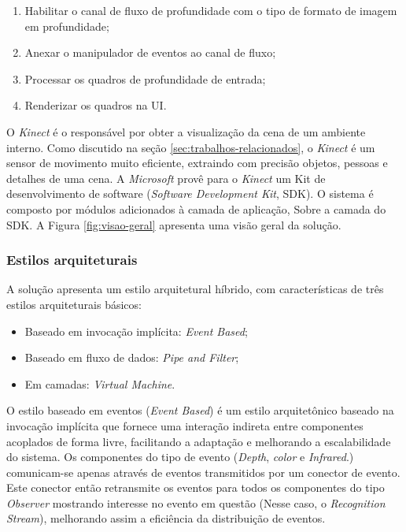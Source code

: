 \begin{enumerate}
    \item Habilitar o canal de fluxo de profundidade com o tipo de formato de imagem em profundidade; 
    \item Anexar o manipulador de eventos ao canal de fluxo; 
    \item Processar os quadros de profundidade de entrada; 
    \item Renderizar os quadros na UI.
\end{enumerate}

O \textit{Kinect} é o responsável por obter a visualização da cena de um ambiente interno. Como discutido na seção \ref{sec:trabalhos-relacionados}, o \textit{Kinect} é um sensor de movimento muito eficiente, extraindo com precisão objetos, pessoas e detalhes de uma cena. A \textit{Microsoft} provê para o \textit{Kinect} um Kit de desenvolvimento de software (\textit{Software Development Kit}, SDK). O sistema é composto por módulos adicionados à camada de aplicação, Sobre a camada do SDK. A Figura \ref{fig:visao-geral} apresenta uma visão geral da solução.

\subsubsection{Estilos arquiteturais}\label{sec:estilosArq}
A solução apresenta um estilo arquitetural híbrido, com características de três estilos arquiteturais básicos:

\begin{itemize}
\item Baseado em invocação implícita: \textit{Event Based}; 
\item Baseado em fluxo de dados: \textit{Pipe and Filter}; 
\item Em camadas: \textit{Virtual Machine}.
\end{itemize}

O estilo baseado em eventos (\textit{Event Based}) é um estilo arquitetônico baseado na invocação implícita que fornece uma interação indireta entre componentes acoplados de forma livre, facilitando a adaptação e melhorando a escalabilidade do sistema. Os componentes do tipo de evento (\textit{Depth}, \textit{color} e \textit{Infrared}.) comunicam-se apenas através de eventos transmitidos por um conector de evento.
Este conector então retransmite os eventos para todos os componentes do tipo \textit{Observer} mostrando interesse no evento em questão (Nesse caso, o \textit{Recognition Stream}), melhorando assim a eficiência da distribuição de eventos.

